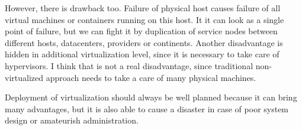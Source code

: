 However, there is drawback too. Failure of physical host causes failure of all virtual machines or containers running on this host. It it can look as a single point of failure, but we can fight it by duplication of service nodes between different hosts, datacenters, providers or continents.
Another disadvantage is hidden in additional virtualization level, since it is necessary to take care of hypervisors. I think that is not a real disadvantage, since traditional non-virtualized approach needs to take a care of many physical machines.

Deployment of virtualization should always be well planned because it can bring many advantages, but it is also able to cause a disaster in case of poor system design or amateurish administration.
